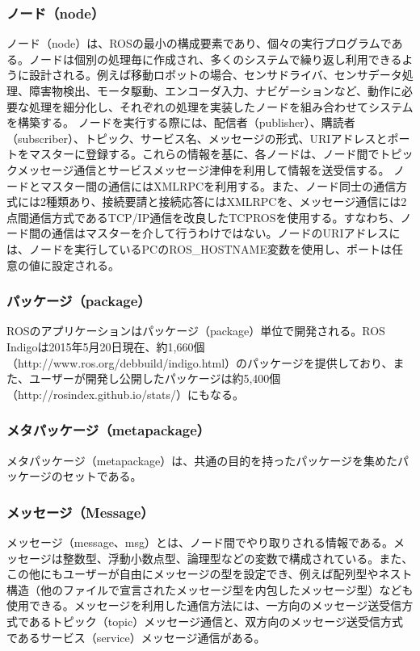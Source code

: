 \subsubsection{ノード（node）}
ノード（node）は、ROSの最小の構成要素であり、個々の実行プログラムである。ノードは個別の処理毎に作成され、多くのシステムで繰り返し利用できるように設計される。例えば移動ロボットの場合、センサドライバ、センサデータ処理、障害物検出、モータ駆動、エンコーダ入力、ナビゲーションなど、動作に必要な処理を細分化し、それぞれの処理を実装したノードを組み合わせてシステムを構築する。
ノードを実行する際には、配信者（publisher）、購読者（subscriber）、トピック、サービス名、メッセージの形式、URIアドレスとポートをマスターに登録する。これらの情報を基に、各ノードは、ノード間でトピックメッセージ通信とサービスメッセージ津伸を利用して情報を送受信する。
ノードとマスター間の通信にはXMLRPCを利用する。また、ノード同士の通信方式には2種類あり、接続要請と接続応答にはXMLRPCを、メッセージ通信には2点間通信方式であるTCP/IP通信を改良したTCPROSを使用する。すなわち、ノード間の通信はマスターを介して行うわけではない。ノードのURIアドレスには、ノードを実行しているPCのROS\_HOSTNAME変数を使用し、ポートは任意の値に設定される。

\subsubsection{パッケージ（package）}
ROSのアプリケーションはパッケージ（package）単位で開発される。ROS Indigoは2015年5月20日現在、約1,660個（http://www.ros.org/debbuild/indigo.html）のパッケージを提供しており、また、ユーザーが開発し公開したパッケージは約5,400個（http://rosindex.github.io/stats/）にもなる。

\subsubsection{メタパッケージ（metapackage）}
メタパッケージ（metapackage）は、共通の目的を持ったパッケージを集めたパッケージのセットである。

\subsubsection{メッセージ（Message）}
メッセージ（message、msg）とは、ノード間でやり取りされる情報である。メッセージは整数型、浮動小数点型、論理型などの変数で構成されている。また、この他にもユーザーが自由にメッセージの型を設定でき、例えば配列型やネスト構造（他のファイルで宣言されたメッセージ型を内包したメッセージ型）なども使用できる。メッセージを利用した通信方法には、一方向のメッセージ送受信方式であるトピック（topic）メッセージ通信と、双方向のメッセージ送受信方式であるサービス（service）メッセージ通信がある。

